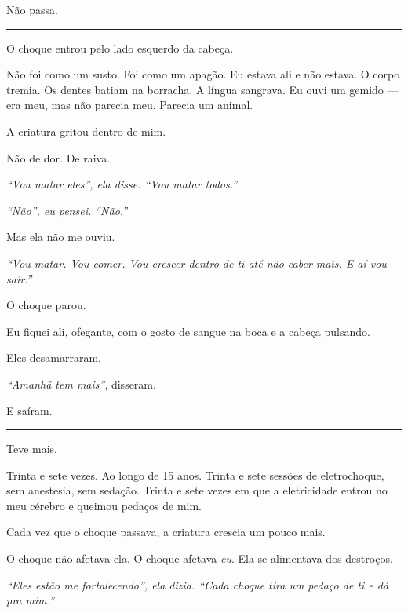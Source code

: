 \noindent Não passa.

\vspace{0.5em}\noindent\rule{\textwidth}{0.5pt}\vspace{0.5em}

\noindent O choque entrou pelo lado esquerdo da cabeça.

\noindent Não foi como um susto. Foi como um apagão. Eu estava ali e não estava. O corpo tremia. Os dentes batiam na borracha. A língua sangrava. Eu ouvi um gemido --- era meu, mas não parecia meu. Parecia um animal.

\noindent A criatura gritou dentro de mim.

\noindent Não de dor.
De raiva.

\noindent \textit{\textquotedblleft{}Vou matar eles\textquotedblright{}\textit{, ela disse. }\textquotedblleft{}Vou matar todos.\textquotedblright{}}

\noindent \textit{\textquotedblleft{}Não\textquotedblright{}\textit{, eu pensei. }\textquotedblleft{}Não.\textquotedblright{}}

\noindent Mas ela não me ouviu.

\noindent \textit{\textquotedblleft{}Vou matar. Vou comer. Vou crescer dentro de ti até não caber mais. E aí vou sair.\textquotedblright{}}

\noindent O choque parou.

\noindent Eu fiquei ali, ofegante, com o gosto de sangue na boca e a cabeça pulsando.

\noindent Eles desamarraram.

\noindent \textit{\textquotedblleft{}Amanhã tem mais\textquotedblright{}}, disseram.

\noindent E saíram.

\vspace{0.5em}\noindent\rule{\textwidth}{0.5pt}\vspace{0.5em}

\noindent Teve mais.

\noindent Trinta e sete vezes. Ao longo de 15 anos. Trinta e sete sessões de eletrochoque, sem anestesia, sem sedação. Trinta e sete vezes em que a eletricidade entrou no meu cérebro e queimou pedaços de mim.

\noindent Cada vez que o choque passava, a criatura crescia um pouco mais.

\noindent O choque não afetava ela.
O choque afetava \textit{eu}.
Ela se alimentava dos destroços.

\noindent \textit{\textquotedblleft{}Eles estão me fortalecendo\textquotedblright{}\textit{, ela dizia. }\textquotedblleft{}Cada choque tira um pedaço de ti e dá pra mim.\textquotedblright{}}

